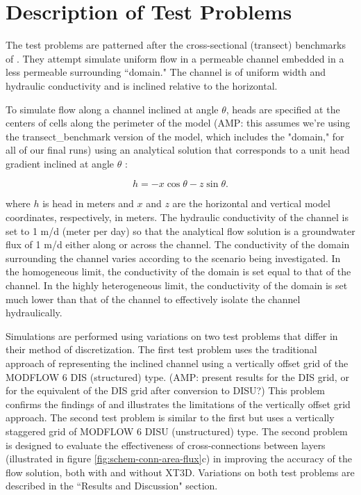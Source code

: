 \documentclass{article}
\begin{document}
\section{Description of Test Problems}

The test problems are patterned after the cross-sectional (transect) benchmarks of \cite{bardot2022}. They attempt simulate uniform flow in a permeable channel embedded in a less permeable surrounding ``domain." The channel is of uniform width and hydraulic conductivity and is inclined relative to the horizontal.

To simulate flow along a channel inclined at angle $\theta$, heads are specified at the centers of cells along the perimeter of the model {\color{red} (AMP: this assumes we're using the transect\_benchmark version of the model, which includes the "domain," for all of our final runs)} using an analytical solution that corresponds to a unit head gradient inclined at angle $\theta$ \citep{bardot2022}:

\begin{equation}
\label{eqn:head_analyt_along}
h = - x \cos \theta - z \sin \theta.
\end{equation}

\noindent where $h$ is head in meters and $x$ and $z$ are the horizontal and vertical model coordinates, respectively, in meters. The hydraulic conductivity of the channel is set to 1 m/d (meter per day) so that the analytical flow solution is a groundwater flux of 1 m/d either along or across the channel. The conductivity of the domain surrounding the channel varies according to the scenario being investigated. In the homogeneous limit, the conductivity of the domain is set equal to that of the channel. In the highly heterogeneous limit, the conductivity of the domain is set much lower than that of the channel to effectively isolate the channel hydraulically.

Simulations are performed using variations on two test problems that differ in their method of discretization. The first test problem uses the traditional approach of representing the inclined channel using a vertically offset grid of the MODFLOW 6 DIS (structured) type. {\color{red} (AMP: present results for the DIS grid, or for the equivalent of the DIS grid after conversion to DISU?)} This problem confirms the findings of \cite{bardot2022} and illustrates the limitations of the vertically offset grid approach. The second test problem is similar to the first but uses a vertically staggered grid of MODFLOW 6 DISU (unstructured) type. The second problem is designed to evaluate the effectiveness of cross-connections between layers (illustrated in figure \ref{fig:schem-conn-area-flux}c) in improving the accuracy of the flow solution, both with and without XT3D. Variations on both test problems are described in the ``Results and Discussion" section.
\end{document}
